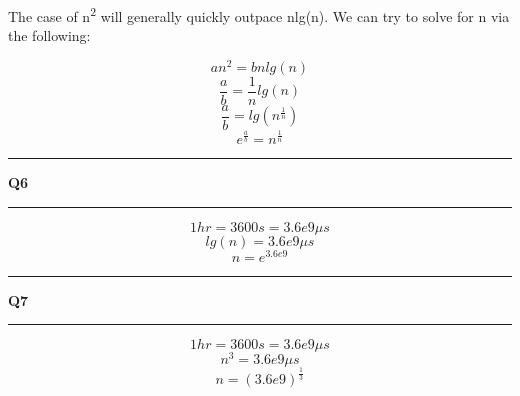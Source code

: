 \documentclass[11pt]{article}
\newcommand\question[2]{\vspace{.25in}\hrule\textbf{#1 #2}\vspace{.5em}\hrule\vspace{.10in}}
\begin{document}
The case of n\textsuperscript{2} will generally quickly outpace nlg(n). We can try to solve for n via the following:

\[an^2 = bnlg(n)\]
\[\frac{a}{b}=\frac{1}{n}lg(n)\]
\[\frac{a}{b}=lg(n^\frac{1}{n})\]
\[e^\frac{a}{b} = n^\frac{1}{n}\]

\question{Q6}{}
\[1 hr = 3600 s = 3.6e9\mu s\]
\[lg(n) = 3.6e9\mu s\]
\[n = e^{3.6e9}\]

\question{Q7}{}
\[1 hr = 3600 s = 3.6e9\mu s\]
\[n^3 = 3.6e9\mu s\]
\[n = (3.6e9)^{\frac{1}{3}}\]
\end{document}
